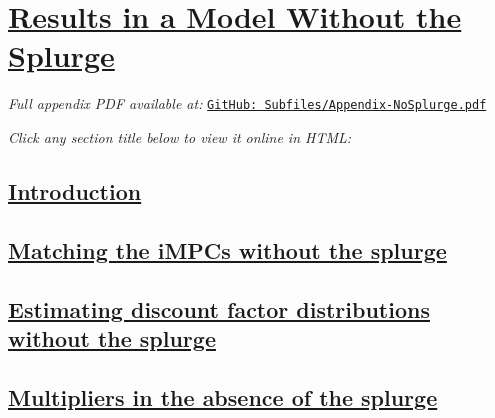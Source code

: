 \documentclass[qe,draft]{econsocart}
\begin{document}



%


\clearpage
\FloatBarrier
\section{\href{https://econ-ark.github.io/HAFiscal/\#app:Model-without-splurge}{Results in a Model Without the Splurge}}
\label{app:Model-without-splurge}

\noindent\textit{Full appendix PDF available at:}
\href{https://github.com/llorracc/HAFiscal-public/blob/master/Subfiles/Appendix-NoSplurge.pdf}{\texttt{GitHub: Subfiles/Appendix-NoSplurge.pdf}}

\medskip
\noindent\textit{Click any section title below to view it online in HTML:}

\medskip

\subsection{\href{https://econ-ark.github.io/HAFiscal/\#app:Model-without-splurge-intro}{Introduction}}
\label{app:Model-without-splurge-intro}

\subsection{\href{https://econ-ark.github.io/HAFiscal/\#app:nosplurge-matching-impcs}{Matching the iMPCs without the splurge}}
\label{app:nosplurge-matching-impcs}

\subsection{\href{https://econ-ark.github.io/HAFiscal/\#app:nosplurge-estimating-betas}{Estimating discount factor distributions without the splurge}}
\label{app:nosplurge-estimating-betas}

\subsection{\href{https://econ-ark.github.io/HAFiscal/\#app:nosplurge-multipliers}{Multipliers in the absence of the splurge}}
\label{app:nosplurge-multipliers}
\end{document}

